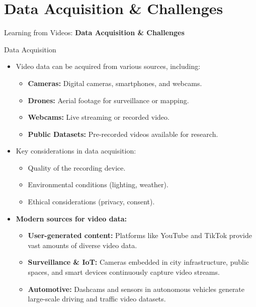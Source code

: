 \section{Data Acquisition \& Challenges}
\begin{frame}{}
    \LARGE Learning from Videos: \textbf{Data Acquisition \& Challenges}
\end{frame}

\begin{frame}[allowframebreaks]{Data Acquisition}
    \begin{itemize}
        \item Video data can be acquired from various sources, including:
        \begin{itemize}
            \item \textbf{Cameras:} Digital cameras, smartphones, and webcams.
            \item \textbf{Drones:} Aerial footage for surveillance or mapping.
            \item \textbf{Webcams:} Live streaming or recorded video.
            \item \textbf{Public Datasets:} Pre-recorded videos available for research.
        \end{itemize}
        \item Key considerations in data acquisition:
        \begin{itemize}
            \item Quality of the recording device.
            \item Environmental conditions (lighting, weather).
            \item Ethical considerations (privacy, consent).
        \end{itemize}
    \end{itemize}
\framebreak
    \begin{itemize}
        \item \textbf{Modern sources for video data:}
        \begin{itemize}
            \item \textbf{User-generated content:} Platforms like YouTube and TikTok provide vast amounts of diverse video data.
            \item \textbf{Surveillance \& IoT:} Cameras embedded in city infrastructure, public spaces, and smart devices continuously capture video streams.
            \item \textbf{Automotive:} Dashcams and sensors in autonomous vehicles generate large-scale driving and traffic video datasets.

\end{itemize}
\end{itemize}
\end{frame}
